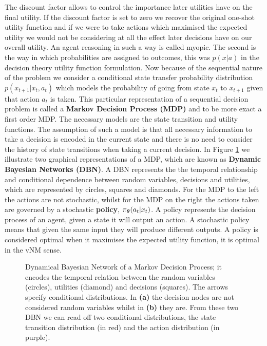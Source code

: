 The discount factor allows to control the importance later utilities have on the final utility. If the discount factor is set to
zero we recover the original one-shot utility function and if we were to take actions which maximised the expected utility 
we would not be considering at all the effect later decisions have on our overall utility. An agent reasoning in such a way is 
called myopic.
The second is the way in which probabilities are assigned to outcomes, this was $p(x|a)$ in the decision theory utility function formulation.
Now because of the sequential nature of the problem we consider a conditional state transfer probability distribution $p(x_{t+1}|x_t,a_t)$
which models the probability of going from state $x_t$ to $x_{t+1}$ given that action $a_t$ is taken. This particular representation of a
sequential decision problem is called a \textbf{Markov Decision Process (MDP)} and to be more exact a first order MDP.
The necessary models are the state transition and utility functions. The assumption of such a model is that all necessary information to 
take a decision is encoded in the current state and there is no need to consider the history of state transitions when taking a current decision.
In Figure \ref{fig:mdp} we illustrate two graphical representations of a MDP, which are known as \textbf{Dynamic Bayesian Networks (DBN)}.
A DBN represents the the temporal relationship and conditional dependence between random variables, decisions and utilities, which are 
represented by circles, squares and diamonds. For the MDP to the left the actions are not stochastic, whilst for the MDP on the right 
the actions taken are governed by a stochastic \textbf{policy}, $\operatorname{\pi_{\boldsymbol{\theta}}}(a_t|x_t)$. A policy represents the decision process of an agent,
given a state it will output an action. A stochastic policy means that given the same input they will produce
different outputs. A policy is considered optimal when it maximises the expected utility function, it is optimal in the vNM sense.

\begin{figure}[h]
  \centering
  \caption{Dynamical Bayesian Network of a Markov Decision Process; it encodes the temporal relation between the random variables (circles),
  utilities (diamond) and decisions (squares). The arrows specify conditional distributions. In \textbf{(a)} the decision nodes are not considered 
  random variables whilst in \textbf{(b)} they are. From these two DBN  we can read off two conditional distributions, the state transition distribution (in red) and the action distribution (in purple). }
    \label{fig:mdp}
\end{figure}

